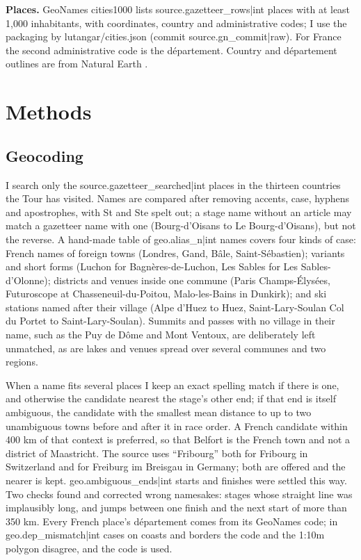 \documentclass[11pt,a4paper]{article}
\begin{document}
\textbf{Places.} GeoNames cities1000 lists {{source.gazetteer_rows|int}} places with at least 1,000 inhabitants, with coordinates, country and administrative codes; I use the packaging by lutangar/cities.json (commit {{source.gn_commit|raw}}). For France the second administrative code is the département. Country and département outlines are from Natural Earth \citep{naturalearth}.

\section{Methods}
\subsection{Geocoding}
I search only the {{source.gazetteer_searched|int}} places in the thirteen countries the Tour has visited. Names are compared after removing accents, case, hyphens and apostrophes, with St and Ste spelt out; a stage name without an article may match a gazetteer name with one (Bourg-d'Oisans to Le Bourg-d'Oisans), but not the reverse. A hand-made table of {{geo.alias_n|int}} names covers four kinds of case: French names of foreign towns (Londres, Gand, Bâle, Saint-Sébastien); variants and short forms (Luchon for Bagnères-de-Luchon, Les Sables for Les Sables-d'Olonne); districts and venues inside one commune (Paris Champs-Élysées, Futuroscope at Chasseneuil-du-Poitou, Malo-les-Bains in Dunkirk); and ski stations named after their village (Alpe d'Huez to Huez, Saint-Lary-Soulan Col du Portet to Saint-Lary-Soulan). Summits and passes with no village in their name, such as the Puy de Dôme and Mont Ventoux, are deliberately left unmatched, as are lakes and venues spread over several communes and two regions.

When a name fits several places I keep an exact spelling match if there is one, and otherwise the candidate nearest the stage's other end; if that end is itself ambiguous, the candidate with the smallest mean distance to up to two unambiguous towns before and after it in race order. A French candidate within 400 km of that context is preferred, so that Belfort is the French town and not a district of Maastricht. The source uses ``Fribourg'' both for Fribourg in Switzerland and for Freiburg im Breisgau in Germany; both are offered and the nearer is kept. {{geo.ambiguous_ends|int}} starts and finishes were settled this way. Two checks found and corrected wrong namesakes: stages whose straight line was implausibly long, and jumps between one finish and the next start of more than 350 km. Every French place's département comes from its GeoNames code; in {{geo.dep_mismatch|int}} cases on coasts and borders the code and the 1:10m polygon disagree, and the code is used.
\end{document}
